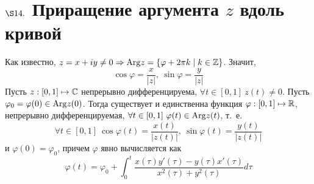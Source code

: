 \section{$\S 14.$ Приращение аргумента $z$ вдоль кривой}
Как известно, $z = x + iy \neq 0 \Rightarrow \mathrm{Arg} z = \left\{\varphi + 2 \pi k
    \mid k \in \mathbb{Z} \right\}$. Значит,
\begin{equation}\label{(14.1)}
    \cos \varphi = \frac{x}{\left| z \right|}, \ \sin \varphi = \frac{y}{\left| z \right|}
\end{equation}
\theorem
Пусть $z: [0,1] \mapsto \mathbb{C}$ непрерывно дифференцируема, $\forall t \in [0,1] \
z(t)\neq 0$. Пусть $\varphi_0 = \varphi(0) \in \mathrm{Arg} z(0)$. Тогда существует и
единственна функция $\varphi: [0,1] \mapsto \mathbb{R}$, непрерывно дифференцируемая,
$\forall t \in [0,1] \ \varphi(t) \in \mathrm{Arg} z(t)$, т.~е.
\begin{equation}\label{(14.2)}
    \forall t \in [0,1] \ \cos \varphi(t) = \frac{x(t)}{\left| z(t) \right|}, \ \sin \varphi(t) = \frac{y(t)}{\left| z(t) \right|}
\end{equation}
и $\varphi(0) = \varphi_0$, причем $\varphi$ явно вычисляется как
\begin{equation}\label{(14.3)}
    \varphi(t) = \varphi_0 + \int_{0}^t \frac{x(\tau)y'(\tau)-y(\tau)x'(\tau)}{x^2(\tau)+y^2(\tau)}d \tau
\end{equation}
\pr
~
